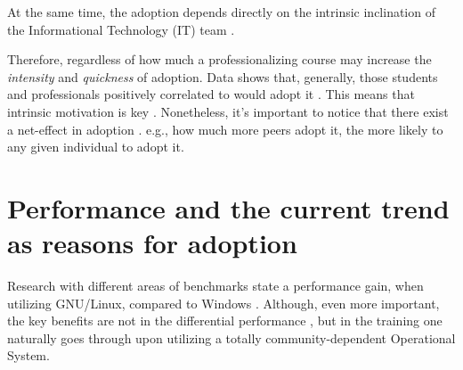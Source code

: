 \documentclass[
12pt,				%
openright,			%
oneside,			%
a4paper,			%
brazil,				%
english,			%
]{abntex2}
\begin{document}
At the same time, the adoption depends directly on the intrinsic inclination of the Informational Technology (IT) team \cite{racero2021can}. 

Therefore, regardless of how much a professionalizing course may increase the \textit{intensity} and \textit{quickness} of adoption. Data shows that, generally, those students and professionals positively correlated to  would adopt it \cite{racero2020predicting}. This means that intrinsic motivation is key \cite{gallego2015open}. Nonetheless, it's important to notice that there exist a net-effect in adoption \cite{spinellis2012organizational}. e.g., how much more peers adopt it, the more likely to any given individual to adopt it.      

\section{Performance and the current trend as reasons for adoption}

Research with different areas of benchmarks state a performance gain, when utilizing GNU/Linux, compared to Windows \cite{sulaiman2021comparison}. Although, even more important, the key benefits are not in the differential performance , but in the training one naturally goes through upon utilizing a totally community-dependent Operational System. 
\end{document}
